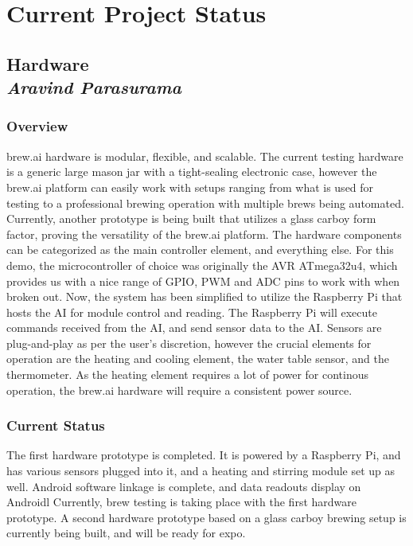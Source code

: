 \documentclass[draftclsnofoot,onecolumn,letterpaper,10pt]{IEEEtran}
\begin{document}
\section{Current Project Status}

\subsection{Hardware\\{\em\textbf{Aravind Parasurama}}}
\subsubsection{Overview}
brew.ai hardware is modular, flexible, and scalable.
The current testing hardware is a generic large mason jar with a tight-sealing
electronic case, however the brew.ai platform can easily work with setups ranging
from what is used for testing to a professional brewing operation with multiple
brews being automated.
Currently, another prototype is being built that utilizes a glass carboy form factor,
proving the versatility of the brew.ai platform.
The hardware components can be categorized as the main controller element, and
everything else.
For this demo, the microcontroller of choice was originally the AVR ATmega32u4, which provides
us with a nice range of GPIO, PWM and ADC pins to work with when broken out.
Now, the system has been simplified to utilize the Raspberry Pi that hosts the AI for module
control and reading.
The Raspberry Pi will execute commands received from the AI, and send
sensor data to the AI.
Sensors are plug-and-play as per the user's discretion, however the crucial elements
for operation are the heating and cooling element, the water table sensor, and
the thermometer.
As the heating element requires a lot of power for continous operation, the brew.ai
hardware will require a consistent power source.

\subsubsection{Current Status}
The first hardware prototype is completed.
It is powered by a Raspberry Pi, and has various sensors plugged into it, and a heating and
stirring module set up as well.
Android software linkage is complete, and data readouts display on Androidl
Currently, brew testing is taking place  with the first hardware prototype.
A second hardware prototype based on a glass carboy brewing setup is currently 
being built, and will be ready for expo.
\end{document}

